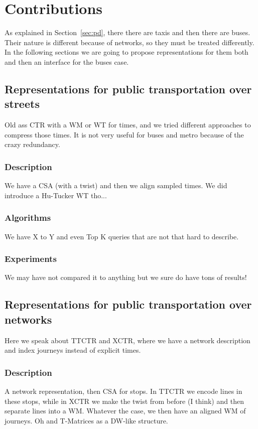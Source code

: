 \documentclass{UniVieCS_PhD} %
\begin{document}
	
	\section{Contributions}
	As explained in Section~\ref{sec:pd}, there there are taxis and then there are buses. Their nature is different because of networks, so they must be treated differently. In the following sections we are going to propose representations for them both and then an interface for the buses case.
	
	\subsection{Representations for public transportation over streets}
	Old ass CTR \cite{brisaboa2018compact} with a WM or WT for times, and we tried different approaches to compress those times. It is not very useful for buses and metro because of the crazy redundancy.
	
	\subsubsection{Description}
	We have a CSA (with a twist) and then we align sampled times. We did introduce a Hu-Tucker WT tho...
	
	\subsubsection{Algorithms}
	We have X to Y and even Top K queries that are not that hard to describe.
	
	\subsubsection{Experiments}
	We may have not compared it to anything but we sure do have tons of results!
	
	\subsection{Representations for public transportation over networks}
	Here we speak about TTCTR and XCTR, where we have a network description and index journeys instead of explicit times.
	
	\subsubsection{Description}
	A network representation, then CSA for stops. In TTCTR we encode lines in these stops, while in XCTR we make the twist from before (I think) and then separate lines into a WM. Whatever the case, we then have an aligned WM of journeys. Oh and T-Matrices as a DW-like structure.
	
\end{document}
